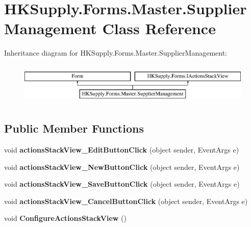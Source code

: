 \hypertarget{class_h_k_supply_1_1_forms_1_1_master_1_1_supplier_management}{}\section{H\+K\+Supply.\+Forms.\+Master.\+Supplier\+Management Class Reference}
\label{class_h_k_supply_1_1_forms_1_1_master_1_1_supplier_management}
Inheritance diagram for H\+K\+Supply.\+Forms.\+Master.\+Supplier\+Management\+:\begin{figure}[H]
\begin{center}
\leavevmode
\includegraphics[height=1.992882cm]{class_h_k_supply_1_1_forms_1_1_master_1_1_supplier_management}
\end{center}
\end{figure}
\subsection*{Public Member Functions}
\begin{DoxyCompactItemize}
\item 
\mbox{\label{class_h_k_supply_1_1_forms_1_1_master_1_1_supplier_management_aaf36a1454800bebf5643ef97aef0b392}} 
void {\bfseries actions\+Stack\+View\+\_\+\+Edit\+Button\+Click} (object sender, Event\+Args e)
\item 
\mbox{\label{class_h_k_supply_1_1_forms_1_1_master_1_1_supplier_management_ae7e48c41376deac783ad8ee182c585ff}} 
void {\bfseries actions\+Stack\+View\+\_\+\+New\+Button\+Click} (object sender, Event\+Args e)
\item 
\mbox{\label{class_h_k_supply_1_1_forms_1_1_master_1_1_supplier_management_a089d87f1eef008c0313ff970b173dff3}} 
void {\bfseries actions\+Stack\+View\+\_\+\+Save\+Button\+Click} (object sender, Event\+Args e)
\item 
\mbox{\label{class_h_k_supply_1_1_forms_1_1_master_1_1_supplier_management_a0c38d36d2bf825744763acecfa4b7f1f}} 
void {\bfseries actions\+Stack\+View\+\_\+\+Cancel\+Button\+Click} (object sender, Event\+Args e)
\item 
\mbox{\label{class_h_k_supply_1_1_forms_1_1_master_1_1_supplier_management_a1f350e08a1376078c3b0a707b67545d5}} 
void {\bfseries Configure\+Actions\+Stack\+View} ()
\end{DoxyCompactItemize}
